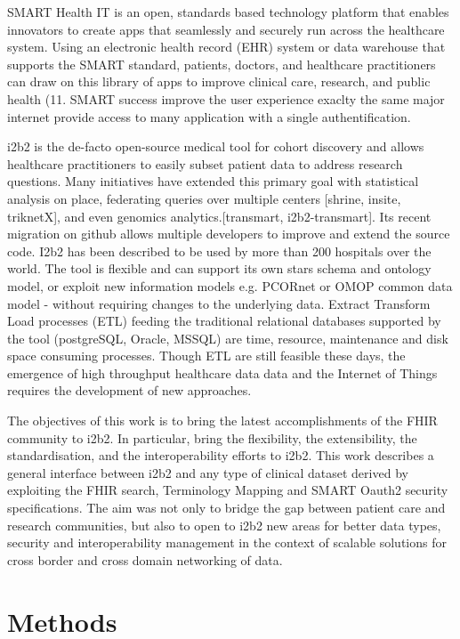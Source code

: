 \documentclass{amia}
\begin{document}
SMART Health IT is an open, standards based technology platform that enables innovators to create apps that seamlessly and securely run across the healthcare system. Using an electronic health record (EHR) system or data warehouse that supports the SMART standard, patients, doctors, and healthcare practitioners can draw on this library of apps to improve clinical care, research, and public health (11. SMART success improve the user experience exaclty the same major internet provide access to many application with a single authentification.

i2b2 is the de-facto open-source medical tool for cohort discovery and allows healthcare practitioners to easily subset patient data to address research questions. Many initiatives have extended this primary goal with statistical analysis on place, federating queries over multiple centers [shrine, insite, triknetX], and even genomics analytics.[transmart, i2b2-transmart]. Its recent migration on github allows multiple developers to improve and extend the source code. I2b2 has been described to be used by more than 200 hospitals over the world. The tool is flexible and can support its own stars schema and ontology model, or exploit new information models e.g. PCORnet\cite{ref13} or OMOP common data model\cite{ref14} - without requiring changes to the underlying data. Extract Transform Load processes (ETL)  feeding the traditional relational databases supported by the tool (postgreSQL, Oracle, MSSQL) are time, resource, maintenance and disk space consuming processes. Though ETL are still feasible these days, the emergence of high throughput healthcare data data and the Internet of Things requires the development of new approaches.

The objectives of this work is to bring the latest accomplishments of the FHIR community to i2b2. In particular, bring the flexibility, the extensibility, the standardisation, and the interoperability efforts to i2b2.
This work describes a general interface between i2b2 and any type of clinical dataset derived by exploiting the FHIR search\cite{}, Terminology Mapping\cite{} and SMART Oauth2 security\cite{} specifications. The aim was not only to bridge the gap between patient care and research communities, but also to open to i2b2 new areas for better data types, security and interoperability management in the context of scalable solutions for cross border and cross domain networking of data.

\section*{Methods}
\end{document}
